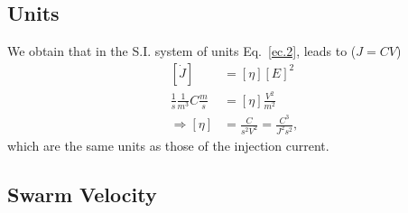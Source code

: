 \documentclass[floatfix,prb,aps,superscriptaddress,11pt]{revtex4}
\begin{document}
\subsection{Units}

We obtain that in the S.I. system of units 
Eq.~\eqref{ec.2}, leads to ($J=CV$) 
\begin{align}\label{ec.4}
[\dot J]&=[\eta] [E]^2 
\nonumber\\
\frac{1}{s}\frac{1}{m^3} C\frac{m}{s}
&=[\eta] \frac{V^2}{m^2}
\nonumber\\
\Rightarrow 
[\eta]&=\frac{C}{s^2V^2}=\frac{C^3}{J^2s^2}
,
\end{align}
which are the same units as those of the injection
current.\cite{cabellosPRB11}

\subsection{Swarm Velocity} 
\end{document}
